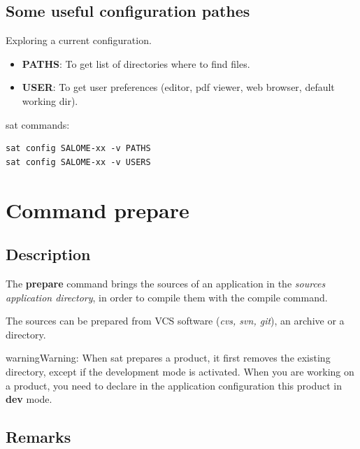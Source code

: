 \documentclass[a4paper,10pt,english]{sphinxmanual}
\begin{document}
\subsection{Some useful configuration pathes}
\label{commands/config:some-useful-configuration-pathes}
Exploring a current configuration.
\begin{itemize}
\item {} 
\textbf{PATHS}: To get list of directories where to find files.

\item {} 
\textbf{USER}: To get user preferences (editor, pdf viewer, web browser, default working dir).

\end{itemize}

sat commands:

\begin{Verbatim}[commandchars=\\\{\}]
sat config SALOME-xx -v PATHS
sat config SALOME-xx -v USERS
\end{Verbatim}


\section{Command prepare}
\label{commands/prepare:svn}\label{commands/prepare:command-prepare}\label{commands/prepare::doc}

\subsection{Description}
\label{commands/prepare:description}
The \textbf{prepare} command brings the sources of an application in the \emph{sources
application directory}, in order to compile them with the compile command.

The sources can be prepared from VCS software (\emph{cvs, svn, git}), an archive or a directory.

\begin{notice}{warning}{Warning:}
When sat prepares a product, it first removes the
existing directory, except if the development mode is activated.
When you are working on a product, you need to declare in
the application configuration this product in \textbf{dev} mode.
\end{notice}


\subsection{Remarks}
\label{commands/prepare:remarks}
\end{document}
